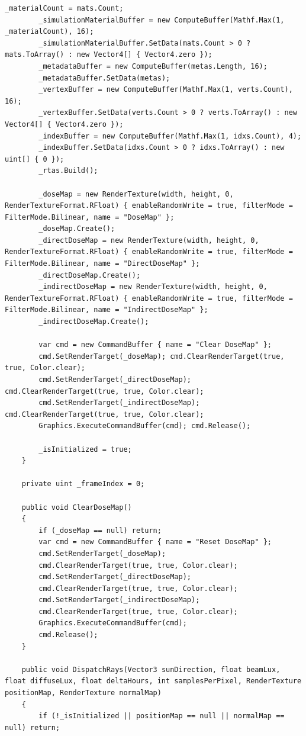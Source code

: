 \begin{lstlisting}[language={[Sharp]C}, caption={IrradianceBaker.cs: Orchestrates the hardware-accelerated DXR raytracing passes.}, label={lst:irradiancebaker}]
        _materialCount = mats.Count;
        _simulationMaterialBuffer = new ComputeBuffer(Mathf.Max(1, _materialCount), 16);
        _simulationMaterialBuffer.SetData(mats.Count > 0 ? mats.ToArray() : new Vector4[] { Vector4.zero });
        _metadataBuffer = new ComputeBuffer(metas.Length, 16);
        _metadataBuffer.SetData(metas);
        _vertexBuffer = new ComputeBuffer(Mathf.Max(1, verts.Count), 16);
        _vertexBuffer.SetData(verts.Count > 0 ? verts.ToArray() : new Vector4[] { Vector4.zero });
        _indexBuffer = new ComputeBuffer(Mathf.Max(1, idxs.Count), 4);
        _indexBuffer.SetData(idxs.Count > 0 ? idxs.ToArray() : new uint[] { 0 });
        _rtas.Build();

        _doseMap = new RenderTexture(width, height, 0, RenderTextureFormat.RFloat) { enableRandomWrite = true, filterMode = FilterMode.Bilinear, name = "DoseMap" };
        _doseMap.Create();
        _directDoseMap = new RenderTexture(width, height, 0, RenderTextureFormat.RFloat) { enableRandomWrite = true, filterMode = FilterMode.Bilinear, name = "DirectDoseMap" };
        _directDoseMap.Create();
        _indirectDoseMap = new RenderTexture(width, height, 0, RenderTextureFormat.RFloat) { enableRandomWrite = true, filterMode = FilterMode.Bilinear, name = "IndirectDoseMap" };
        _indirectDoseMap.Create();

        var cmd = new CommandBuffer { name = "Clear DoseMap" };
        cmd.SetRenderTarget(_doseMap); cmd.ClearRenderTarget(true, true, Color.clear);
        cmd.SetRenderTarget(_directDoseMap); cmd.ClearRenderTarget(true, true, Color.clear);
        cmd.SetRenderTarget(_indirectDoseMap); cmd.ClearRenderTarget(true, true, Color.clear);
        Graphics.ExecuteCommandBuffer(cmd); cmd.Release();

        _isInitialized = true;
    }

    private uint _frameIndex = 0;

    public void ClearDoseMap()
    {
        if (_doseMap == null) return;
        var cmd = new CommandBuffer { name = "Reset DoseMap" };
        cmd.SetRenderTarget(_doseMap);
        cmd.ClearRenderTarget(true, true, Color.clear);
        cmd.SetRenderTarget(_directDoseMap);
        cmd.ClearRenderTarget(true, true, Color.clear);
        cmd.SetRenderTarget(_indirectDoseMap);
        cmd.ClearRenderTarget(true, true, Color.clear);
        Graphics.ExecuteCommandBuffer(cmd);
        cmd.Release();
    }

    public void DispatchRays(Vector3 sunDirection, float beamLux, float diffuseLux, float deltaHours, int samplesPerPixel, RenderTexture positionMap, RenderTexture normalMap)
    {
        if (!_isInitialized || positionMap == null || normalMap == null) return;
        

\end{lstlisting}

